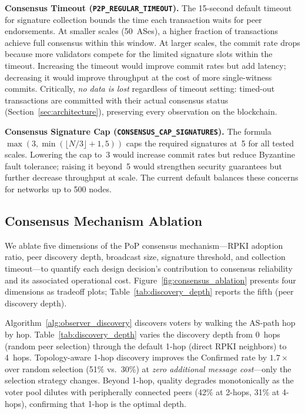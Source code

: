 \textbf{Consensus Timeout (\texttt{P2P\_REGULAR\_TIMEOUT}).} The 15-second default timeout for signature collection bounds the time each transaction waits for peer endorsements. At smaller scales (50~ASes), a higher fraction of transactions achieve full consensus within this window. At larger scales, the commit rate drops because more validators compete for the limited signature slots within the timeout. Increasing the timeout would improve commit rates but add latency; decreasing it would improve throughput at the cost of more single-witness commits. Critically, \emph{no data is lost} regardless of timeout setting: timed-out transactions are committed with their actual consensus status (Section~\ref{sec:architecture}), preserving every observation on the blockchain.

\textbf{Consensus Signature Cap (\texttt{CONSENSUS\_CAP\_SIGNATURES}).} The formula $\max(3, \min(\lfloor N/3 \rfloor + 1, 5))$ caps the required signatures at~5 for all tested scales. Lowering the cap to~3 would increase commit rates but reduce Byzantine fault tolerance; raising it beyond~5 would strengthen security guarantees but further decrease throughput at scale. The current default balances these concerns for networks up to 500 nodes.

\subsection{Consensus Mechanism Ablation}
\label{subsec:consensus_ablation}

We ablate five dimensions of the PoP consensus mechanism---RPKI adoption ratio, peer discovery depth, broadcast size, signature threshold, and collection timeout---to quantify each design decision's contribution to consensus reliability and its associated operational cost. Figure~\ref{fig:consensus_ablation} presents four dimensions as tradeoff plots; Table~\ref{tab:discovery_depth} reports the fifth (peer discovery depth).

Algorithm~\ref{alg:observer_discovery} discovers voters by walking the AS-path hop by hop. Table~\ref{tab:discovery_depth} varies the discovery depth from 0~hops (random peer selection) through the default 1-hop (direct RPKI neighbors) to 4~hops. Topology-aware 1-hop discovery improves the Confirmed rate by $1.7\times$ over random selection (51\% vs.\ 30\%) at \emph{zero additional message cost}---only the selection strategy changes. Beyond 1-hop, quality degrades monotonically as the voter pool dilutes with peripherally connected peers (42\% at 2-hops, 31\% at 4-hops), confirming that 1-hop is the optimal depth.

